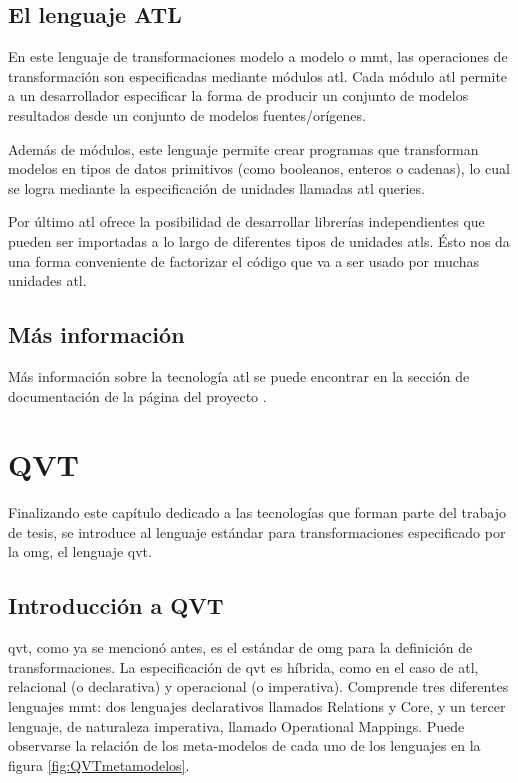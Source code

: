 \documentclass[a4paper,12pt,oneside,spanish]{book}
\begin{document}
\subsection{El lenguaje ATL}

En este lenguaje de transformaciones modelo a modelo o \gls{mmt}, las operaciones de transformación son especificadas mediante módulos \gls{atl}. Cada módulo \gls{atl} permite a un desarrollador especificar la forma de producir un conjunto de modelos resultados desde un conjunto de modelos fuentes/orígenes. 

Además de módulos, este lenguaje permite crear programas que transforman modelos en tipos de datos primitivos (como booleanos, enteros o cadenas), lo cual se logra mediante la especificación de unidades llamadas \gls{atl} queries.

Por último \gls{atl} ofrece la posibilidad de desarrollar librerías independientes que pueden ser importadas a lo largo de diferentes tipos de unidades \glspl{atl}. Ésto nos da una forma conveniente de factorizar el código que va a ser usado por muchas unidades \gls{atl}.


\subsection{Más información}

Más información sobre la tecnología \gls{atl} se puede encontrar en la sección de documentación de la página del proyecto \cite[\url{www.eclipse.org/atl/}]{ATL}.


\section{QVT}
\label{sec:QVT}

Finalizando este capítulo dedicado a las tecnologías que forman parte del trabajo de tesis, se introduce al lenguaje estándar para transformaciones especificado por la \gls{omg}, el lenguaje \gls{qvt}.


\subsection{Introducción a QVT}

\gls{qvt}, como ya se mencionó antes, es el estándar de \gls{omg} para la definición de transformaciones. La especificación de \gls{qvt} es híbrida, como en el caso de \gls{atl}, relacional (o declarativa) y operacional (o imperativa). Comprende tres diferentes lenguajes \gls{mmt}: dos lenguajes declarativos llamados \textsf{Relations} y \textsf{Core}, y un tercer lenguaje, de naturaleza imperativa, llamado \textsf{Operational Mappings}. Puede observarse la relación de los meta-modelos de cada uno de los lenguajes en la figura \ref{fig:QVTmetamodelos}. 
\end{document}
